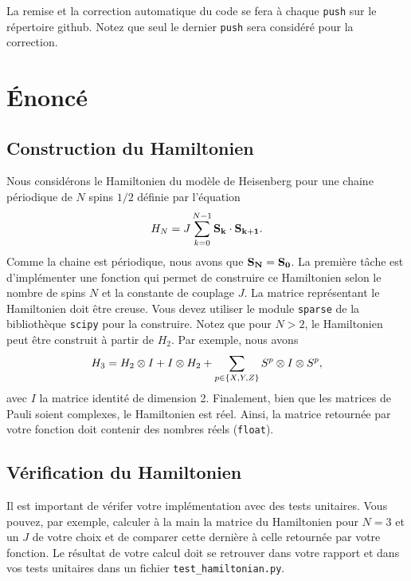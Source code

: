 \documentclass[12pt, letterpaper]{article}
\begin{document}
\bigskip

\noindent La remise et la correction automatique du code se fera à chaque \texttt{push} sur le répertoire github.
Notez que seul le dernier \texttt{push} sera considéré pour la correction.


\section{Énoncé}\label{sec:enonce}

\subsection{Construction du Hamiltonien}\label{subsec:construction-du-hamiltonien}

\noindent Nous considérons le Hamiltonien du modèle de Heisenberg pour une chaine périodique de
$N$ spins $1/2$ définie par l'équation
\begin{equation}
  H_N = J \sum_{k=0}^{N-1} \vb{S_k} \cdot \vb{S_{k+1}}.
\end{equation}
Comme la chaine est périodique, nous avons que $\vb{S_N} = \vb{S_0}$.
La première tâche est d'implémenter une fonction qui permet de construire
ce Hamiltonien selon le nombre de spins $N$ et la constante de couplage $J$.
La matrice représentant le Hamiltonien doit être creuse.
Vous devez utiliser le module \texttt{sparse} de la bibliothèque \texttt{scipy}
pour la construire.
Notez que pour $N > 2$, le Hamiltonien peut être construit à partir de $H_2$.
Par exemple, nous avons
\begin{equation}
  H_3 = H_2 \otimes I + I \otimes H_2 + \sum_{p\in\qty{X, Y, Z}} S^p \otimes I \otimes S^p,
\end{equation}
avec $I$ la matrice identité de dimension 2.
Finalement, bien que les matrices de Pauli soient complexes,
le Hamiltonien est réel.
Ainsi, la matrice retournée par votre fonction doit contenir des nombres
réels (\texttt{float}).

\subsection{Vérification du Hamiltonien}\label{subsec:verification-du-hamiltonien}

Il est important de vérifer votre implémentation avec des tests unitaires.
Vous pouvez, par exemple, calculer à la main la matrice du Hamiltonien pour
$N = 3$ et un $J$ de votre choix et de comparer cette dernière à celle retournée par
votre fonction.
Le résultat de votre calcul doit se retrouver dans votre rapport et dans vos tests unitaires dans
un fichier \texttt{test\_hamiltonian.py}.
\end{document}
